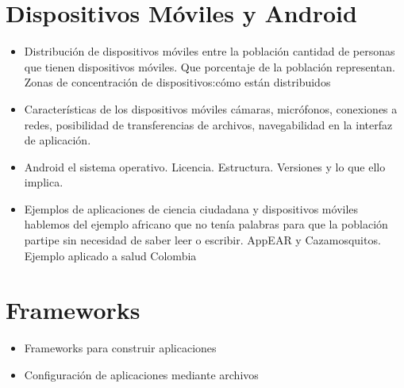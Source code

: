 	
	

\section{ Dispositivos Móviles y Android }
\begin{itemize}
	\item Distribución de dispositivos móviles entre la población
	cantidad de personas que tienen dispositivos móviles. Que porcentaje de la población representan. Zonas de concentración de dispositivos:cómo están distribuidos
	\item Características de los dispositivos móviles
	cámaras, micrófonos, conexiones a redes, posibilidad de transferencias de archivos, navegabilidad en la interfaz de aplicación.
	\item Android
	el sistema operativo. Licencia. Estructura. Versiones y lo que ello implica.
	\item Ejemplos de aplicaciones de ciencia ciudadana y dispositivos móviles
	hablemos del ejemplo africano que no tenía palabras para que la población partipe sin necesidad de saber leer o escribir. AppEAR y Cazamosquitos. Ejemplo aplicado a salud Colombia
\end{itemize}

\section{ Frameworks }

\begin{itemize}
	\item Frameworks para construir aplicaciones
	\item Configuración de aplicaciones mediante archivos
\end{itemize}



